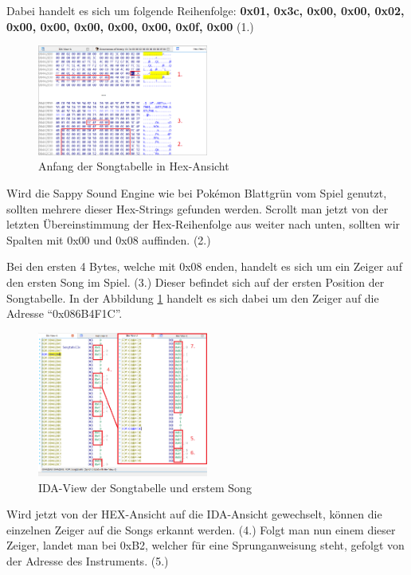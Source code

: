 \documentclass[11pt,a4paper]{scrartcl}
\begin{document}
Dabei handelt es sich um folgende Reihenfolge:\newline
\textbf{0x01, 0x3c, 0x00, 0x00, 0x02, 0x00, 0x00, 0x00, 0x00, 0x00, 0x0f, 0x00} (1.)

\begin{figure}
    \centering
    \vspace{-5mm}
	\includegraphics[width=0.5\textwidth]{Songtabelle}
	\caption{Anfang der Songtabelle in Hex-Ansicht}
	\label{fig:hex-view}
\end{figure}

Wird die Sappy Sound Engine wie bei Pok\'{e}mon Blattgr\"un vom Spiel genutzt, sollten mehrere dieser Hex-Strings gefunden werden. Scrollt man jetzt von der letzten \"Ubereinstimmung der Hex-Reihenfolge aus weiter nach unten, sollten wir Spalten mit 0x00 und 0x08 auffinden. (2.)

Bei den ersten 4 Bytes, welche mit 0x08 enden, handelt es sich um ein Zeiger auf den ersten Song im Spiel. (3.) Dieser befindet sich auf der ersten Position der Songtabelle. In der Abbildung \ref{fig:hex-view} handelt es sich dabei um den Zeiger auf die Adresse \enquote{0x086B4F1C}.

\newpage
\begin{figure}
    \centering
    \includegraphics[width=0.5\textwidth]{SongtabellenHeader}
	\caption{IDA-View der Songtabelle und erstem Song}
	\label{fig:IDA-view}
\end{figure}

Wird jetzt von der HEX-Ansicht auf die IDA-Ansicht gewechselt, k\"onnen die einzelnen Zeiger auf die Songs erkannt werden. (4.) Folgt man nun einem dieser Zeiger, landet man bei 0xB2, welcher f\"ur eine Sprunganweisung steht, gefolgt von der Adresse des Instruments. (5.)
\end{document}
